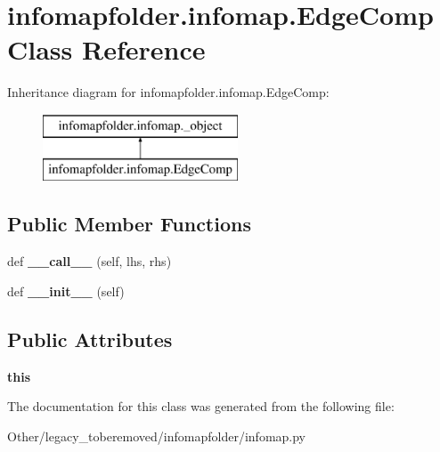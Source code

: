 \hypertarget{classinfomapfolder_1_1infomap_1_1EdgeComp}{}\section{infomapfolder.\+infomap.\+Edge\+Comp Class Reference}
\label{classinfomapfolder_1_1infomap_1_1EdgeComp}
Inheritance diagram for infomapfolder.\+infomap.\+Edge\+Comp\+:\begin{figure}[H]
\begin{center}
\leavevmode
\includegraphics[height=2.000000cm]{classinfomapfolder_1_1infomap_1_1EdgeComp}
\end{center}
\end{figure}
\subsection*{Public Member Functions}
\begin{DoxyCompactItemize}
\item 
\mbox{\label{classinfomapfolder_1_1infomap_1_1EdgeComp_ae351fe2dd3e69b451fb411ba588aea4a}} 
def {\bfseries \+\_\+\+\_\+call\+\_\+\+\_\+} (self, lhs, rhs)
\item 
\mbox{\label{classinfomapfolder_1_1infomap_1_1EdgeComp_a846316c585271efa54aae8e5efb773ec}} 
def {\bfseries \+\_\+\+\_\+init\+\_\+\+\_\+} (self)
\end{DoxyCompactItemize}
\subsection*{Public Attributes}
\begin{DoxyCompactItemize}
\item 
\mbox{\label{classinfomapfolder_1_1infomap_1_1EdgeComp_accb7c5d85426f15e3b27fa9fbff11769}} 
{\bfseries this}
\end{DoxyCompactItemize}


The documentation for this class was generated from the following file\+:\begin{DoxyCompactItemize}
\item 
Other/legacy\+\_\+toberemoved/infomapfolder/infomap.\+py\end{DoxyCompactItemize}
